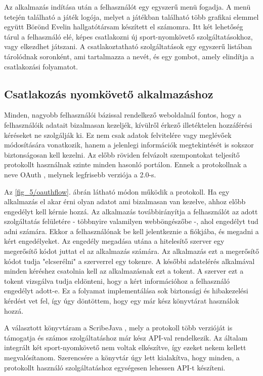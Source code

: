 Az alkalmazás indítása után a felhasználót egy egyszerű menü fogadja. 
A menü tetején található a játék logója, melyet a játékban található több grafikai elemmel együtt Börönd Evelin hallgatótársam készített el számomra. 
Itt két lehetőség tárul a felhasználó elé, képes csatlakozni új sport-nyomkövető szolgáltatásokhoz, vagy elkezdhet játszani. 
A csatlakoztatható szolgáltatások egy egyszerű listában tárolódnak soronként, ami tartalmazza a nevét, és egy gombot, amely elindítja a csatlakozási folyamatot. 

\subsection*{Csatlakozás nyomkövető alkalmazáshoz}
\label{trackerconnect}
Minden, nagyobb felhasználói bázissal rendelkező weboldalnál fontos, hogy a felhasználóik adatait bizalmasan kezeljék, kívülről érkező illetéktelen hozzáférési kéréseket ne szolgálják ki. 
Ez nem csak adatok felvitelére vagy meglévőek módosítására vonatkozik, hanem a jelenlegi információk megtekintését is sokszor biztonságosan kell kezelni. 
Az előbb röviden felvázolt szempontokat teljesítő protokollt használnak szinte minden hasonló portálon. 
Ennek a protokollnak a neve OAuth \cite{oauthprotocol}, melynek legfrisebb verziója a 2.0-s. 


Az \ref{fig_5/oauthflow}. ábrán látható módon működik a protokoll. 
Ha egy alkalmazás el akar érni olyan adatot ami bizalmasan van kezelve, ahhoz előbb engedélyt kell kérnie hozzá. 
Az alkalmazás továbbirányítja a felhasználót az adott szolgáltatás felületére - többnyire valamilyen webböngészőbe -, ahol engedélyt tud adni számára. 
Ekkor a felhasználónak be kell jelentkeznie a fiókjába, és megadni a kért engedélyeket. 
Az engedély megadása utána a hitelesítő szerver egy megerősítő kódot juttat el az alkalmazás számára. 
Az alkalmazás ezt a megerősítő kódot tudja "elcserélni" a szerverrel egy tokenre. 
A későbbi adatelérés alkalmával minden kéréshez csatolnia kell az alkalmazásnak ezt a tokent. 
A szerver ezt a tokent vizsgálva tudja eldönteni, hogy a kért információhoz a felhasználó engedélyt adott-e. 
Ez a folyamat implementálása sok biztonsági és hibakezelési kérdést vet fel, így úgy döntöttem, hogy egy már kész könyvtárat használok hozzá. 

A választott könyvtáram a ScribeJava \cite{scribejava}, mely a protokoll több verzióját is támogatja és számos szolgáltatáshoz már kész API-val rendelkezik. 
Az általam integrált két sport-nyomkövető nem voltak elkészítve, így ezeket nekem kellett megvalósítanom. 
Szerencsére a könyvtár úgy lett kialakítva, hogy minden, a protokollt használó szolgáltatáshoz egységesen lehessen API-t készíteni. 

